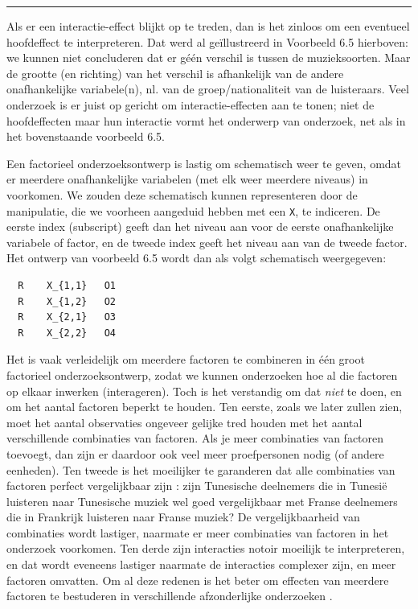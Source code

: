 \documentclass[
]{book}
\begin{document}
\begin{center}\rule{0.5\linewidth}{0.5pt}\end{center}

Als er een interactie-effect blijkt op te treden, dan is het zinloos om
een eventueel hoofdeffect te interpreteren. Dat werd al geïllustreerd in
Voorbeeld 6.5 hierboven: we kunnen niet concluderen dat er géén
verschil is tussen de muzieksoorten. Maar de grootte (en richting) van
het verschil is afhankelijk van de andere onafhankelijke variabele(n),
nl. van de groep/nationaliteit van de luisteraars. Veel onderzoek is er
juist op gericht om interactie-effecten aan te tonen; niet de
hoofdeffecten maar hun interactie vormt het onderwerp van onderzoek, net
als in het bovenstaande voorbeeld 6.5.

Een factorieel onderzoeksontwerp is lastig om schematisch weer te geven,
omdat er meerdere onafhankelijke variabelen (met elk weer meerdere
niveaus) in voorkomen. We zouden deze schematisch kunnen representeren
door de manipulatie, die we voorheen aangeduid hebben met een \texttt{X}, te
indiceren. De eerste index (subscript) geeft dan het niveau aan voor de
eerste onafhankelijke variabele of factor, en de tweede index geeft het
niveau aan van de tweede factor. Het ontwerp van voorbeeld 6.5 wordt dan als volgt schematisch weergegeven:

\begin{verbatim}
  R    X_{1,1}   O1
  R    X_{1,2}   O2
  R    X_{2,1}   O3
  R    X_{2,2}   O4
\end{verbatim}

Het is vaak verleidelijk om meerdere factoren te combineren in één groot
factorieel onderzoeksontwerp, zodat we kunnen onderzoeken hoe al die
factoren op elkaar inwerken (interageren). Toch is het verstandig om dat
\emph{niet} te doen, en om het aantal factoren beperkt te houden. Ten eerste,
zoals we later zullen zien, moet het aantal observaties ongeveer gelijke
tred houden met het aantal verschillende combinaties van factoren. Als
je meer combinaties van factoren toevoegt, dan zijn er daardoor ook veel
meer proefpersonen nodig (of andere eenheden). Ten tweede is het
moeilijker te garanderen dat alle combinaties van factoren perfect
vergelijkbaar zijn \citep[p.266]{SCC02}: zijn Tunesische deelnemers die in
Tunesië luisteren naar Tunesische muziek wel goed vergelijkbaar met
Franse deelnemers die in Frankrijk luisteren naar Franse muziek? De
vergelijkbaarheid van combinaties wordt lastiger, naarmate er meer
combinaties van factoren in het onderzoek voorkomen. Ten derde zijn
interacties notoir moeilijk te interpreteren, en dat wordt eveneens
lastiger naarmate de interacties complexer zijn, en meer factoren
omvatten. Om al deze redenen is het beter om effecten van meerdere
factoren te bestuderen in verschillende afzonderlijke onderzoeken
\citep{Quene10}.
\end{document}
